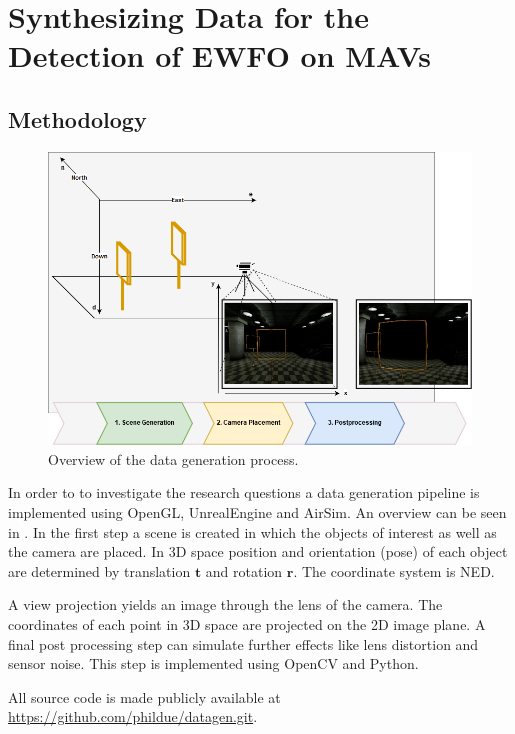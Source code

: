 \chapter{Synthesizing Data for the Detection of \ac{EWFO} on \acp{MAV}}


\section{Methodology}
\begin{figure}[htbp]
	\centering
	\includegraphics[width=\textwidth]{fig/datagen_notation}
	\caption{Overview of the data generation process.}
	\label{fig:training:datagen_notation}
\end{figure}

In order to to investigate the research questions a data generation pipeline is implemented using OpenGL, UnrealEngine and AirSim. An overview can be seen in . In the first step a scene is created in which the objects of interest as well as the camera are placed. In 3D space position and orientation (pose) of each object are determined by translation $\textbf{t}$ and rotation $\textbf{r}$. The coordinate system is \ac{NED}.

A view projection yields an image through the lens of the camera. The coordinates of each point in 3D space are projected on the 2D image plane. A final post processing step can simulate further effects like lens distortion and sensor noise. This step is implemented using OpenCV and Python.

All source code is made publicly available at \url{https://github.com/phildue/datagen.git}.

